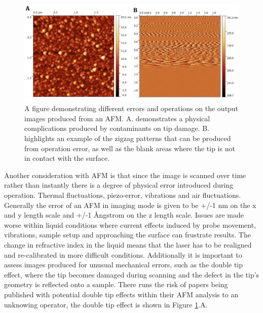 \begin{figure}[h!]     %
        \begin{center}
          \includegraphics[width=140mm]{chapter2/Error.png}
\end{center}
\caption{A figure demonstrating different errors and operations on the output images produced from an AFM.  A.  demonstrates  a  physical  complications produced by contaminants on tip damage.  B. highlights an example of the zigzag patterns that can be produced from operation error, as well as the blank areas where the tip is not in contact with the surface.  }
\label{fig:Errorr}                 %
\end{figure}

Another consideration with AFM is that since the image is scanned over time rather than instantly there is a degree of physical error introduced during operation. Thermal fluctuations, piezo-error, vibrations and air fluctuations. Generally the error of an AFM in imaging mode is given to be +/-1 nm on the x and y length scale and +/-1 \AA{}ngstrom on the z length scale. Issues are made worse within liquid conditions where current effects induced by probe movement, vibrations, sample setup and approaching the surface can frustrate results. The change in refractive index in the liquid means that the laser has to be realigned and re-calibrated in more difficult conditions. Additionally it is important to assess images produced for unusual mechanical errors, such as the double tip effect, where the tip becomes damaged during scanning and the defect in the tip's geometry is reflected onto a sample. There runs the risk of papers being published with potential double tip effects within their AFM analysis to an unknowing operator, the double tip effect is shown in Figure \ref{fig:Errorr}.A.

